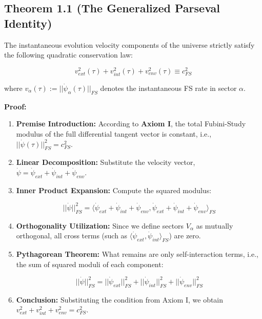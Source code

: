 \subsection{Theorem 1.1 (The Generalized Parseval Identity)}

The instantaneous evolution velocity components of the universe strictly satisfy the following quadratic conservation law:

$$v_{ext}^2(\tau) + v_{int}^2(\tau) + v_{env}^2(\tau) \equiv c_{FS}^2$$

where \textbf{$v_{\alpha}(\tau) := ||\dot{\psi}_{\alpha}(\tau)||_{FS}$} denotes the instantaneous FS rate in sector \textbf{$\alpha$}.

\textbf{Proof:}

\begin{enumerate}
\item \textbf{Premise Introduction:} According to \textbf{Axiom I}, the total Fubini-Study modulus of the full differential tangent vector is constant, i.e., \textbf{$||\dot{\psi}(\tau)||_{FS}^2 = c_{FS}^2$}.

\item \textbf{Linear Decomposition:} Substitute the velocity vector, \textbf{$\dot{\psi} = \dot{\psi}_{ext} + \dot{\psi}_{int} + \dot{\psi}_{env}$}.

\item \textbf{Inner Product Expansion:} Compute the squared modulus:

   $$||\dot{\psi}||_{FS}^2 = \langle \dot{\psi}_{ext} + \dot{\psi}_{int} + \dot{\psi}_{env}, \dot{\psi}_{ext} + \dot{\psi}_{int} + \dot{\psi}_{env} \rangle_{FS}$$

\item \textbf{Orthogonality Utilization:} Since we define sectors \textbf{$V_{\alpha}$} as mutually orthogonal, all cross terms (such as \textbf{$\langle \dot{\psi}_{ext}, \dot{\psi}_{int} \rangle_{FS}$}) are zero.

\item \textbf{Pythagorean Theorem:} What remains are only self-interaction terms, i.e., the sum of squared moduli of each component:

   $$||\dot{\psi}||_{FS}^2 = ||\dot{\psi}_{ext}||_{FS}^2 + ||\dot{\psi}_{int}||_{FS}^2 + ||\dot{\psi}_{env}||_{FS}^2$$

\item \textbf{Conclusion:} Substituting the condition from Axiom I, we obtain \textbf{$v_{ext}^2 + v_{int}^2 + v_{env}^2 = c_{FS}^2$}.
\end{enumerate}

